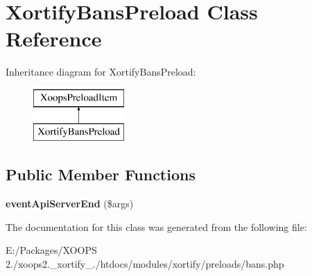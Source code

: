 \hypertarget{class_xortify_bans_preload}{\section{Xortify\-Bans\-Preload Class Reference}
\label{class_xortify_bans_preload}
}
Inheritance diagram for Xortify\-Bans\-Preload\-:\begin{figure}[H]
\begin{center}
\leavevmode
\includegraphics[height=2.000000cm]{class_xortify_bans_preload}
\end{center}
\end{figure}
\subsection*{Public Member Functions}
\begin{DoxyCompactItemize}
\item 
\hypertarget{class_xortify_bans_preload_ae448384a73a28f332e0ef5991bb20337}{{\bfseries event\-Api\-Server\-End} (\$args)}\label{class_xortify_bans_preload_ae448384a73a28f332e0ef5991bb20337}

\end{DoxyCompactItemize}


The documentation for this class was generated from the following file\-:\begin{DoxyCompactItemize}
\item 
E\-:/\-Packages/\-X\-O\-O\-P\-S 2./xoops2.\-\_\-xortify\-\_./htdocs/modules/xortify/preloads/bans.\-php\end{DoxyCompactItemize}
